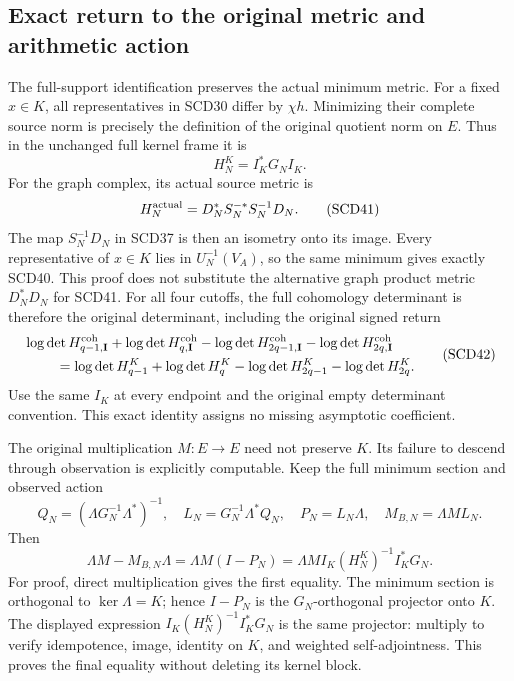 \documentclass[11pt,a4paper]{article}
\theoremstyle{definition}\newtheorem{definition}[theorem]{Definition}
\begin{document}
\subsection{Exact return to the original metric and arithmetic action}

The full-support identification preserves the actual minimum metric.
For a fixed \(x\in K\), all representatives in SCD30 differ by
\(\chi h\). Minimizing their complete source norm is precisely
the definition of the original quotient norm on \(E\). Thus in
the unchanged full kernel frame it is
\[
 H^K_N=I_K^*G_NI_K .
 \tag{SCD40}
\]
For the graph complex, its actual source metric is
\[
 H_N^{\rm actual}=D_N^*S_N^{-*}S_N^{-1}D_N .
 \tag{SCD41}
\]
The map \(S_N^{-1}D_N\) in SCD37 is then an isometry onto its
image. Every representative of \(x\in K\) lies in
\(U_N^{-1}(V_A)\), so the same minimum gives exactly SCD40.
This proof does not substitute the alternative graph product
metric \(D_N^*D_N\) for SCD41. For all four cutoffs, the full
cohomology determinant is therefore the original determinant,
including the original signed return
\[
 \begin{split}
 &\log\det H^{\rm coh}_{q-1,\mathbf I}
 +\log\det H^{\rm coh}_{q,\mathbf I}
 -\log\det H^{\rm coh}_{2q-1,\mathbf I}
 -\log\det H^{\rm coh}_{2q,\mathbf I}\\
 &\hspace{8mm}=
 \log\det H^K_{q-1}+\log\det H^K_q
 -\log\det H^K_{2q-1}-\log\det H^K_{2q}.
 \end{split}
 \tag{SCD42}
\]
Use the same \(I_K\) at every endpoint and the original empty
determinant convention. This exact identity assigns no missing
asymptotic coefficient.

The original multiplication \(M:E\to E\) need not preserve \(K\).
Its failure to descend through observation is explicitly computable.
Keep the full minimum section and observed action
\[
 Q_N=(\Lambda G_N^{-1}\Lambda^*)^{-1},\quad
 L_N=G_N^{-1}\Lambda^*Q_N,\quad P_N=L_N\Lambda,\quad
 M_{B,N}=\Lambda ML_N .
\]
Then
\[
 \Lambda M-M_{B,N}\Lambda
 =\Lambda M(I-P_N)
 =\Lambda MI_K(H_N^K)^{-1}I_K^*G_N .
 \tag{SCD43}
\]
For proof, direct multiplication gives the first equality.
The minimum section is orthogonal to \(\ker\Lambda=K\);
hence \(I-P_N\) is the \(G_N\)-orthogonal projector onto \(K\).
The displayed expression \(I_K(H_N^K)^{-1}I_K^*G_N\)
is the same projector: multiply to verify idempotence, image,
identity on \(K\), and weighted self-adjointness. This proves
the final equality without deleting its kernel block.
\end{document}
